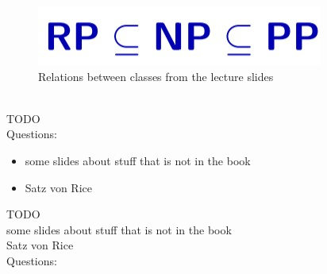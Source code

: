 \documentclass[a4]{scrartcl}
\begin{document}
\begin{figure}[H]
\begin{center}
\includegraphics[scale=0.5]{cc2.jpg}
\end{center}
\caption{Relations between classes from the lecture slides \cite{CC}}
\end{figure}

\ \\

\color{red} TODO \\
\color{black}
\color{violet} Questions: \\
\color{black}




\begin{itemize}
\item some slides about stuff that is not in the book
\item Satz von Rice
\end{itemize}


\color{red} TODO \\
some slides about stuff that is not in the book \\
Satz von Rice \\
\color{black}
\color{violet} Questions: \\
\color{black}



\newpage

\printbibliography
\end{document}
